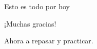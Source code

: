 \documentclass[11pt,handout,aspectratio=1610]{beamer}
\newcommand{\vs}{\vspace{11pt}}
\begin{document}






\begin{frame}{Esto es todo por hoy}

    \begin{center}
        {\huge ¡Muchas gracias!}

        \vs

        Ahora a repasar y practicar.
    \end{center}

\end{frame}
\end{document}
